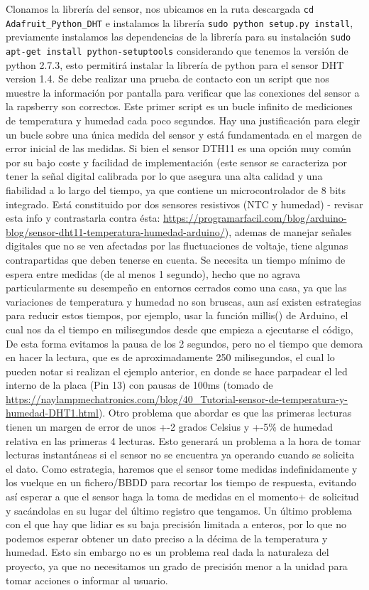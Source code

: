 Clonamos la librería del sensor, nos ubicamos en la ruta descargada \verb|cd Adafruit_Python_DHT| e instalamos la librería \verb|sudo python setup.py install|, previamente instalamos las dependencias de la librería para su instalación \verb|sudo apt-get install python-setuptools| considerando que tenemos la versión de python 2.7.3, esto permitirá instalar la librería de python para el sensor DHT version 1.4. Se debe realizar una prueba de contacto con un script que nos muestre la información por pantalla para verificar que las conexiones del sensor a la rapsberry son correctos. Este primer script es un bucle infinito de mediciones de temperatura y humedad cada poco segundos. Hay una justificación para elegir un bucle sobre una única medida del sensor y está fundamentada en el margen de error inicial de las medidas. Si bien el sensor DTH11 es una opción muy común por su bajo coste y facilidad de implementación (este sensor se caracteriza por tener la señal digital calibrada por lo que asegura una alta calidad y una fiabilidad a lo largo del tiempo, ya que contiene un microcontrolador de 8 bits integrado. Está constituido por dos sensores resistivos (NTC y humedad) - revisar esta info y contrastarla contra ésta: \url{ https://programarfacil.com/blog/arduino-blog/sensor-dht11-temperatura-humedad-arduino/}), ademas de manejar señales digitales que no se ven afectadas por las fluctuaciones de voltaje, tiene algunas contrapartidas que deben tenerse en cuenta. Se necesita un tiempo mínimo de espera entre medidas (de al menos 1 segundo), hecho que no agrava particularmente su desempeño en entornos cerrados como una casa, ya que las variaciones de temperatura y humedad no son bruscas, aun así existen estrategias para reducir estos tiempos, por ejemplo, usar la función millis() de Arduino, el cual nos da el tiempo en milisegundos desde que empieza a ejecutarse el código, De esta forma evitamos la pausa de los 2 segundos, pero no el tiempo que demora en hacer la lectura, que es de aproximadamente  250 milisegundos, el cual lo pueden notar si realizan el ejemplo anterior, en donde se hace parpadear el led interno de la placa (Pin 13) con pausas de 100ms (tomado de \url{https://naylampmechatronics.com/blog/40_Tutorial-sensor-de-temperatura-y-humedad-DHT1.html}). Otro problema que abordar es que las primeras lecturas tienen un margen de error de unos +-2 grados Celsius y +-5\% de humedad relativa en las primeras 4 lecturas. Esto generará un problema a la hora de tomar lecturas instantáneas si el sensor no se encuentra ya operando cuando se solicita el dato. Como estrategia, haremos que el sensor tome medidas indefinidamente y los vuelque en un fichero/BBDD para recortar los tiempo de respuesta, evitando así esperar a que el sensor haga la toma de medidas en el momento+ de solicitud y sacándolas en su lugar del último registro que tengamos. Un último problema con el que hay que lidiar es su baja precisión limitada a enteros, por lo que no podemos esperar obtener un dato preciso a la décima de la temperatura y humedad. Esto sin embargo no es un problema real dada la naturaleza del proyecto, ya que no necesitamos un grado de precisión menor a la unidad para tomar acciones o informar al usuario.
